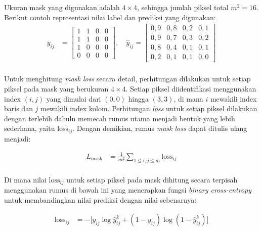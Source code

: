 
Ukuran mask yang digunakan adalah $4 \times 4$, sehingga jumlah piksel total $m^2 = 16$. Berikut contoh representasi nilai label dan prediksi yang digunakan: \\

\begin{align*}
y_{ij} &=
\begin{bmatrix}
1 & 1 & 0 & 0 \\
1 & 1 & 0 & 0 \\
1 & 0 & 0 & 0 \\
0 & 0 & 0 & 0
\end{bmatrix}, \quad
\hat{y}_{ij} =
\begin{bmatrix}
0{,}9 & 0{,}8 & 0{,}2 & 0{,}1 \\
0{,}9 & 0{,}7 & 0{,}3 & 0{,}2 \\
0{,}8 & 0{,}4 & 0{,}1 & 0{,}1 \\
0{,}2 & 0{,}1 & 0{,}1 & 0{,}0
\end{bmatrix}
\\[0.5em]
\end{align*}

Untuk menghitung \textit{mask loss} secara detail, perhitungan dilakukan untuk setiap piksel pada mask yang berukuran $4 \times 4$. Setiap piksel diidentifikasi menggunakan index $(i,j)$ yang dimulai dari $(0,0)$ hingga $(3,3)$, di mana $i$ mewakili index baris dan $j$ mewakili index kolom. Perhitungan \textit{loss} untuk setiap piksel dilakukan dengan terlebih dahulu memecah rumus utama menjadi bentuk yang lebih sederhana, yaitu $\text{loss}_{ij}$. Dengan demikian, rumus \textit{mask loss} dapat ditulis ulang menjadi:

\begin{align*}
    L_{\text{mask}} &= \frac{1}{m^2}\sum_{1 \leq i,j \leq m} \text{loss}_{ij} \\[0.5em]
\end{align*}

Di mana nilai $\text{loss}_{ij}$ untuk setiap piksel pada mask dihitung secara terpisah menggunakan rumus di bawah ini yang menerapkan fungsi \textit{binary cross-entropy} untuk membandingkan nilai prediksi dengan nilai sebenarnya:

\begin{align*}
	{\text{loss}_{ij}} &= -\Big[ y_{ij} \log \hat{y}^{k}_{ij} + (1 - y_{ij}) \log (1 - \hat{y}^{k}_{ij}) \Big] \\[0.5em]
\end{align*}

